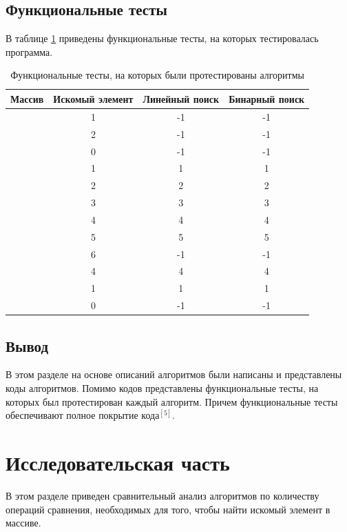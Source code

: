 \documentclass{article}
\begin{document}
\clearpage\subsection{Функциональные тесты}
В таблице \ref{tbl:func_test} приведены функциональные тесты, на которых тестировалась программа.
\begin{table}[h]
	\begin{center}
	\caption{\label{tbl:func_test} Функциональные тесты, на которых были протестированы алгоритмы}
	\begin{tabular}{|c|c|c|c|}
		\hline
		Массив & Искомый элемент & Линейный поиск &  Бинарный поиск
		\\ \hline
		[ ] & 1 & -1 & -1  
		\\ \hline
		[ 1 ] & 2 & -1 & -1                             
		\\ \hline
		[ 1, 2, 3, 4, 5 ] & 0 & -1 & -1 
		\\ \hline
		[ 1, 2, 3, 4, 5 ] & 1 & 1 & 1 
		\\ \hline
		[ 1, 2, 3, 4, 5 ] & 2 & 2 & 2 
		\\ \hline
		[ 1, 2, 3, 4, 5 ] & 3 & 3 & 3 
		\\ \hline
		[ 1, 2, 3, 4, 5 ] & 4 & 4 & 4 
		\\ \hline
		[ 1, 2, 3, 4, 5 ] & 5 & 5 & 5 
		\\ \hline
		[ 1, 2, 3, 4, 5 ] & 6 & -1 & -1 
		\\ \hline
		[ 1, 2, 3, 4 ] & 4 & 4 & 4 
		\\ \hline
		[ 1, 2, 3, 4 ] & 1 & 1 & 1 
		\\ \hline
		[ 1, 2, 3, 4 ] & 0 & -1 & -1 
		\\ \hline
	\end{tabular}
	\end{center}
\end{table}

\subsection{Вывод}
В этом разделе на основе описаний алгоритмов были написаны и представлены коды алгоритмов. Помимо кодов
представлены функциональные тесты, на которых был протестирован каждый алгоритм. Причем функциональные тесты
обеспечивают полное покрытие кода$^{[5]}$.


\clearpage\section{Исследовательская часть}
В этом разделе приведен сравнительный анализ алгоритмов по количеству операций сравнения, необходимых для того, чтобы 
найти искомый элемент в массиве.
\end{document}

